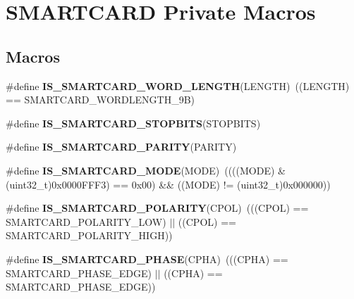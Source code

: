 \hypertarget{group___s_m_a_r_t_c_a_r_d___private___macros}{}\section{S\+M\+A\+R\+T\+C\+A\+RD Private Macros}
\label{group___s_m_a_r_t_c_a_r_d___private___macros}
\subsection*{Macros}
\begin{DoxyCompactItemize}
\item 
\#define {\bfseries I\+S\+\_\+\+S\+M\+A\+R\+T\+C\+A\+R\+D\+\_\+\+W\+O\+R\+D\+\_\+\+L\+E\+N\+G\+TH}(L\+E\+N\+G\+TH)~((L\+E\+N\+G\+TH) == S\+M\+A\+R\+T\+C\+A\+R\+D\+\_\+\+W\+O\+R\+D\+L\+E\+N\+G\+T\+H\+\_\+9B)\hypertarget{group___s_m_a_r_t_c_a_r_d___private___macros_ga963c514e557b58c5c11bb60ab2660259}{}\label{group___s_m_a_r_t_c_a_r_d___private___macros_ga963c514e557b58c5c11bb60ab2660259}

\item 
\#define {\bfseries I\+S\+\_\+\+S\+M\+A\+R\+T\+C\+A\+R\+D\+\_\+\+S\+T\+O\+P\+B\+I\+TS}(S\+T\+O\+P\+B\+I\+TS)
\item 
\#define {\bfseries I\+S\+\_\+\+S\+M\+A\+R\+T\+C\+A\+R\+D\+\_\+\+P\+A\+R\+I\+TY}(P\+A\+R\+I\+TY)
\item 
\#define {\bfseries I\+S\+\_\+\+S\+M\+A\+R\+T\+C\+A\+R\+D\+\_\+\+M\+O\+DE}(M\+O\+DE)~((((M\+O\+DE) \& (uint32\+\_\+t)0x0000\+F\+F\+F3) == 0x00) \&\& ((\+M\+O\+D\+E) != (uint32\+\_\+t)0x000000))\hypertarget{group___s_m_a_r_t_c_a_r_d___private___macros_ga2dc06686d0651b6a8504ccffd028d2c4}{}\label{group___s_m_a_r_t_c_a_r_d___private___macros_ga2dc06686d0651b6a8504ccffd028d2c4}

\item 
\#define {\bfseries I\+S\+\_\+\+S\+M\+A\+R\+T\+C\+A\+R\+D\+\_\+\+P\+O\+L\+A\+R\+I\+TY}(C\+P\+OL)~(((C\+P\+OL) == S\+M\+A\+R\+T\+C\+A\+R\+D\+\_\+\+P\+O\+L\+A\+R\+I\+T\+Y\+\_\+\+L\+OW) $\vert$$\vert$ ((C\+P\+OL) == S\+M\+A\+R\+T\+C\+A\+R\+D\+\_\+\+P\+O\+L\+A\+R\+I\+T\+Y\+\_\+\+H\+I\+GH))\hypertarget{group___s_m_a_r_t_c_a_r_d___private___macros_gab728caa9af7ecfe085a67603df18e567}{}\label{group___s_m_a_r_t_c_a_r_d___private___macros_gab728caa9af7ecfe085a67603df18e567}

\item 
\#define {\bfseries I\+S\+\_\+\+S\+M\+A\+R\+T\+C\+A\+R\+D\+\_\+\+P\+H\+A\+SE}(C\+P\+HA)~(((C\+P\+HA) == S\+M\+A\+R\+T\+C\+A\+R\+D\+\_\+\+P\+H\+A\+S\+E\+\_\+E\+D\+GE) $\vert$$\vert$ ((C\+P\+HA) == S\+M\+A\+R\+T\+C\+A\+R\+D\+\_\+\+P\+H\+A\+S\+E\+\_\+E\+D\+GE))\hypertarget{group___s_m_a_r_t_c_a_r_d___private___macros_gad4f2566348232722026dc4861ed76125}{}\label{group___s_m_a_r_t_c_a_r_d___private___macros_gad4f2566348232722026dc4861ed76125}


\end{DoxyCompactItemize}
